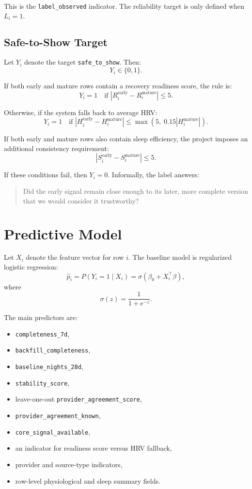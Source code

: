 \documentclass[11pt]{article}
\begin{document}
This is the \texttt{label\_observed} indicator. The reliability target is only defined when $L_i = 1$.

\subsection{Safe-to-Show Target}

Let $Y_i$ denote the target \texttt{safe\_to\_show}. Then:
\[
Y_i \in \{0,1\}.
\]

If both early and mature rows contain a recovery readiness score, the rule is:
\[
Y_i = 1 \quad \text{if } \left|R_i^{\text{early}} - R_i^{\text{mature}}\right| \le 5.
\]

Otherwise, if the system falls back to average HRV:
\[
Y_i = 1 \quad \text{if } \left|H_i^{\text{early}} - H_i^{\text{mature}}\right|
\le \max\left(5,\;0.15\left|H_i^{\text{mature}}\right|\right).
\]

If both early and mature rows also contain sleep efficiency, the project imposes an additional consistency requirement:
\[
\left|S_i^{\text{early}} - S_i^{\text{mature}}\right| \le 5.
\]

If these conditions fail, then $Y_i = 0$. Informally, the label answers:
\begin{quote}
Did the early signal remain close enough to its later, more complete version that we would consider it trustworthy?
\end{quote}

\section{Predictive Model}

Let $X_i$ denote the feature vector for row $i$. The baseline model is regularized logistic regression:
\[
\hat{p}_i = P(Y_i = 1 \mid X_i)
= \sigma\left(\beta_0 + X_i^\top \beta\right),
\]
where
\[
\sigma(z) = \frac{1}{1+e^{-z}}.
\]

The main predictors are:
\begin{itemize}[leftmargin=1.5em]
    \item \texttt{completeness\_7d},
    \item \texttt{backfill\_completeness},
    \item \texttt{baseline\_nights\_28d},
    \item \texttt{stability\_score},
    \item leave-one-out \texttt{provider\_agreement\_score},
    \item \texttt{provider\_agreement\_known},
    \item \texttt{core\_signal\_available},
    \item an indicator for readiness score versus HRV fallback,
    \item provider and source-type indicators,
    \item row-level physiological and sleep summary fields.
\end{itemize}
\end{document}
